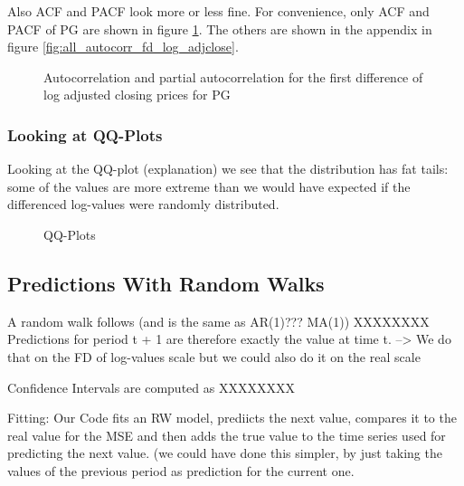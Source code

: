Also ACF and PACF look more or less fine. For convenience, only ACF and PACF of PG are shown in figure \ref{fig:PG_autocorr_fd_log_adjclose}. The others are shown in the appendix in figure \ref{fig:all_autocorr_fd_log_adjclose}.
\begin{figure}[H]
    \centering
    \begin{adjustbox}{width=.9\textwidth,center}
    
    \end{adjustbox}  
    \caption{Autocorrelation and partial autocorrelation for the first difference of log adjusted closing prices for PG}
    \label{fig:PG_autocorr_fd_log_adjclose}
\end{figure}{}


\subsubsection*{Looking at QQ-Plots}
Looking at the QQ-plot (explanation) we see that the distribution has fat tails: some of the values are more extreme than we would have expected if the differenced log-values were randomly distributed. 

\begin{figure}[h]
    \centering
    \begin{adjustbox}{width=.9\textwidth,center}
    \end{adjustbox}  
    \caption{QQ-Plots}
    \label{fig:all_qq_fd_log_adjclose}
\end{figure}{}







\subsection{Predictions With Random Walks}
A random walk follows (and is the same as AR(1)??? MA(1))
XXXXXXXX
Predictions for period t + 1 are therefore exactly the value at time t. --> We do that on the FD of log-values scale but we could also do it on the real scale

Confidence Intervals are computed as
XXXXXXXX

Fitting: 
Our Code fits an RW model, prediicts the next value, compares it to the real value for the MSE and then adds the true value to the time series used for predicting the next value. (we could have done this simpler, by just taking the values of the previous period as prediction for the current one. 

